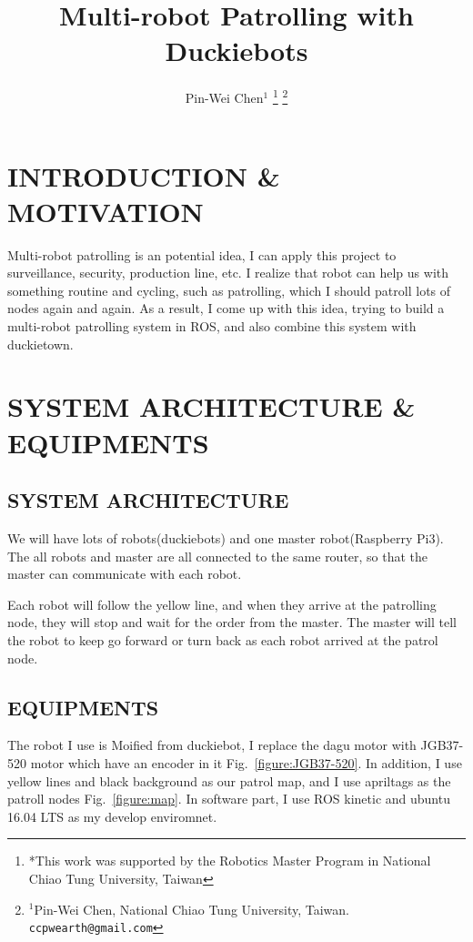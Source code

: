 \documentclass[letterpaper, 10 pt, conference]{ieeeconf}  %
\title{\LARGE \bf
Multi-robot Patrolling with Duckiebots
}
\author{Pin-Wei Chen$^{1}$%
\thanks{*This work was supported by the Robotics Master Program in National Chiao Tung University, Taiwan}%
\thanks{$^{1}$Pin-Wei Chen, National Chiao Tung University, Taiwan.		{\tt\small ccpwearth@gmail.com}}%
}
\begin{document}
\maketitle
\thispagestyle{empty}
\pagestyle{empty}


\section{INTRODUCTION \& MOTIVATION}

Multi-robot patrolling is an potential idea, I can apply this project to surveillance, security, production line, etc. I realize that robot can help us with something routine and cycling, such as patrolling, which I should patroll lots of nodes again and again. As a result, I come up with this idea, trying to build a multi-robot patrolling system in ROS, and also combine this system with duckietown.

\section{SYSTEM ARCHITECTURE \& EQUIPMENTS}

\subsection{SYSTEM ARCHITECTURE}

We will have lots of robots(duckiebots) and one master robot(Raspberry Pi3). The all robots and master are all connected to the same router, so that the master can communicate with each robot.

Each robot will follow the yellow line, and when they arrive at the patrolling node, they will stop and wait for the order from the master. The master will tell the robot to keep go forward or turn back as each robot arrived at the patrol node.

\subsection{EQUIPMENTS} 

The robot I use is Moified from duckiebot, I replace the dagu motor with JGB37-520 motor which have an encoder in it Fig.~\ref{figure:JGB37-520}. In addition, I use yellow lines and black background as our patrol map, and I use apriltags as the patroll nodes Fig.~\ref{figure:map}. In software part, I use ROS kinetic and ubuntu 16.04 LTS as my develop enviromnet.
\end{document}
